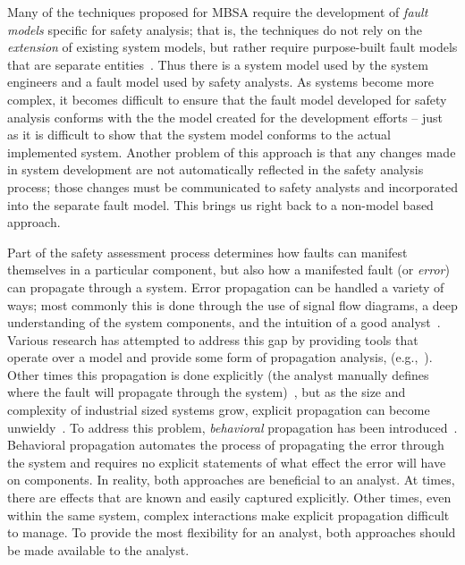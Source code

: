 Many of the techniques proposed for MBSA require the development of {\em fault models} specific for safety analysis; that is, the techniques do not rely on the \emph{extension} of existing system models, but rather require purpose-built fault models that are separate entities~\cite{symbAltaRica, DBLP:conf/tacas/BittnerBCCGGMMZ16, info8010007, Gudemann:2010:FQQ:1909626.1909813}. Thus there is a system model used by the system engineers and a fault model used by safety analysts. %
As systems become more complex, it becomes difficult to ensure that the fault model developed for safety analysis conforms with the the model created for the development efforts -- just as it is difficult to show that the system model conforms to the actual implemented system. Another problem of this approach is that any changes made in system development are not automatically reflected in the safety analysis process; those changes must be communicated to safety analysts and incorporated into the separate fault model. This brings us right back to a non-model based approach.

Part of the safety assessment process determines how faults can manifest themselves in a particular component, but also how a manifested fault (or \emph{error}) can propagate through a system. Error propagation can be handled a variety of ways; most commonly this is done through the use of signal flow diagrams, a deep understanding of the system components, and the intuition of a good analyst~\cite{lisagor2010failure}. Various research has attempted to address this gap by providing tools that operate over a model and provide some form of propagation analysis, (e.g.,~\cite{EMV2, Joshi05:SafeComp, DBLP:conf/tacas/BittnerBCCGGMMZ16}). Other times this propagation is done explicitly (the analyst manually defines where the fault will propagate through the system)~\cite{lisagor2011model}, but as the size and complexity of industrial sized systems grow, explicit propagation can become unwieldy~\cite{Stewart17:IMBSA}. To address this problem, \emph{behavioral} propagation has been introduced~\cite{DBLP:conf/tacas/BittnerBCCGGMMZ16,stewart2020safety}. Behavioral propagation automates the process of propagating the error through the system and requires no explicit statements of what effect the error will have on components. In reality, both approaches are beneficial to an analyst. At times, there are effects that are known and easily captured explicitly. Other times, even within the same system, complex interactions make explicit propagation difficult to manage. To provide the most flexibility for an analyst, both approaches should be made available to the analyst.

